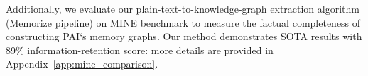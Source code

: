 Additionally, we evaluate our plain-text-to-knowledge-graph extraction algorithm (Memorize pipeline) on MINE benchmark to measure the factual completeness of constructing PAI`s memory graphs. Our method demonstrates SOTA results with 89\% information-retention score: more details are provided in Appendix~\ref{app:mine_comparison}. 

